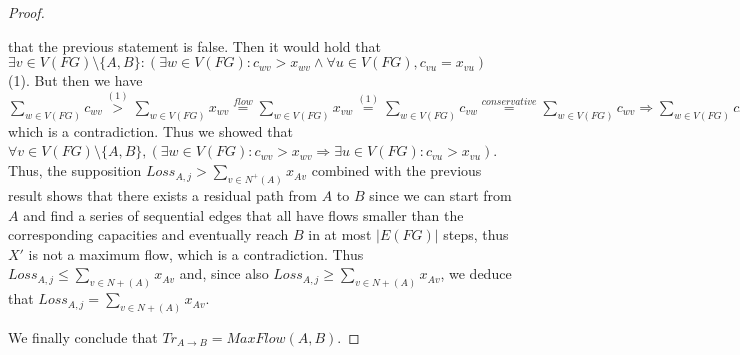 \documentclass[11pt]{article}
\theoremstyle{definition}
\theoremstyle{corollary}
\theoremstyle{lemma}
\begin{document}
\begin{proof}
\begin{itemize}
\begin{itemize}
             that the previous statement is false. Then it would hold that $\exists v \in V(FG) \setminus \{A,B\} :
             (\exists w \in V(FG) : c_{wv} > x_{wv} \wedge \forall u \in V(FG), c_{vu} = x_{vu})$ (1). But then we have
             $\sum\limits_{w \in V(FG)}c_{wv} \overset{(1)}{>} \sum\limits_{w \in V(FG)}x_{wv} \overset{flow}{=}
             \sum\limits_{w \in V(FG)}x_{vw} \overset{(1)}{=} \sum\limits_{w \in V(FG)}c_{vw} \overset{conservative}{=}
             \sum\limits_{w \in V(FG)}c_{wv} \Rightarrow \sum\limits_{w \in V(FG)}c_{wv} > \sum\limits_{w \in V(FG)}c_{wv}$
             which is a contradiction. Thus we showed that $\forall v \in V(FG) \setminus \{A,B\}, (\exists w \in V(FG) :
             c_{wv} > x_{wv} \Rightarrow \exists u \in V(FG) : c_{vu} > x_{vu})$. \\
             Thus, the supposition $Loss_{A, j} > \sum\limits_{v \in N^{+}(A)}x_{Av}$ combined with the previous result shows
             that there exists a residual path from $A$ to $B$ since we can start from $A$ and find a series of sequential
             edges that all have flows smaller than the corresponding capacities and eventually reach $B$ in at most
             $|E(FG)|$ steps, thus $X'$ is not a maximum flow, which is a contradiction. Thus $Loss_{A,j} \leq
             \sum\limits_{v \in N{+}(A)}x_{Av}$ and, since also $Loss_{A,j} \geq \sum\limits_{v \in N{+}(A)}x_{Av}$, we
             deduce that $Loss_{A,j} = \sum\limits_{v \in N{+}(A)}x_{Av}$.
          \end{itemize}
       \end{itemize}
       We finally conclude that $Tr_{A \rightarrow B} = MaxFlow(A, B)$.
    \end{proof}
\end{document}

